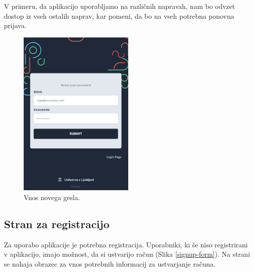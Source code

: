 V primeru, da aplikacijo uporabljamo na različnih napravah, nam bo odvzet dostop iz vseh ostalih naprav, kar pomeni, da bo na vseh potrebna ponovna prijava.

\clearpage

\begin{figure}[h]
\begin{center}
\includegraphics[width=0.5\textwidth]{slike/reset_password.png}
\end{center}
\caption{ Vnos novega gesla. }
\label{password-reset-form}
\end{figure}

\subsection{Stran za registracijo }
\label{registration-page}
Za uporabo aplikacije je potrebna registracija. Uporabniki, ki še niso registrirani v aplikacijo, imajo možnost, da si ustvarijo račun (Slika \ref{signup-form}). Na strani se nahaja obrazec za vnos potrebnih informacij za ustvarjanje računa.

